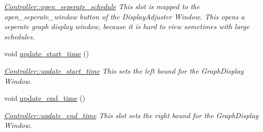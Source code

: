 \begin{DoxyCompactItemize}
\begin{DoxyCompactList}\small\item\em \hyperlink{classController_aeec075efe687085d150d1e47504485c2}{Controller\+::open\+\_\+seperate\+\_\+schedule} This slot is mapped to the open\+\_\+seperate\+\_\+window button of the Display\+Adjuster Window. This opens a seperate graph display window, because it is hard to view sometimes with large schedules. \end{DoxyCompactList}\item 
\mbox{\label{classController_a5cc451d3dd99282686381c3ff4e06e8a}} 
void \hyperlink{classController_a5cc451d3dd99282686381c3ff4e06e8a}{update\+\_\+start\+\_\+time} ()
\begin{DoxyCompactList}\small\item\em \hyperlink{classController_a5cc451d3dd99282686381c3ff4e06e8a}{Controller\+::update\+\_\+start\+\_\+time} This sets the left bound for the Graph\+Display Window. \end{DoxyCompactList}\item 
\mbox{\label{classController_a9342c31418f227c4ab532bcc060ced7b}} 
void \hyperlink{classController_a9342c31418f227c4ab532bcc060ced7b}{update\+\_\+end\+\_\+time} ()
\begin{DoxyCompactList}\small\item\em \hyperlink{classController_a9342c31418f227c4ab532bcc060ced7b}{Controller\+::update\+\_\+end\+\_\+time} This slot sets the right bound for the Graph\+Display Window. \end{DoxyCompactList}\end{DoxyCompactItemize}
